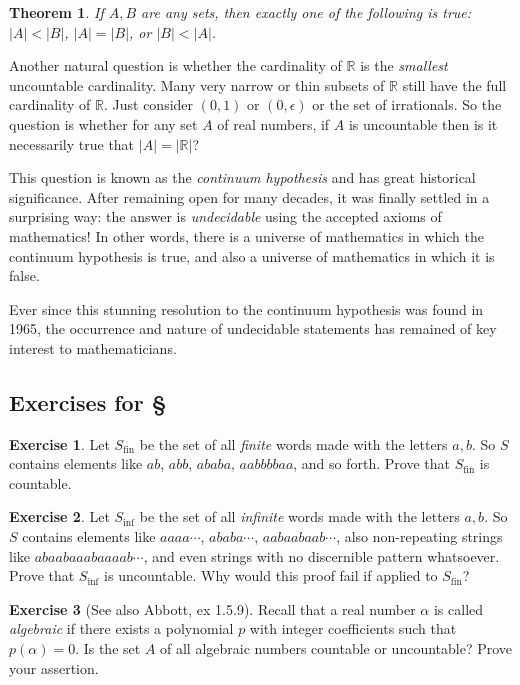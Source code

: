 \documentclass[11pt,oneside]{amsbook}
\newcommand{\R}{\mathbb R}
\theoremstyle{definition}
\newtheorem{exerc}{Exercise}[section]
\theoremstyle{plain}
\newtheorem{thm}{Theorem}[section]
\theoremstyle{definition}
\theoremstyle{remark}
\numberwithin{equation}{section}
\numberwithin{figure}{section}
\begin{document}
\begin{thm}
  If $A,B$ are any sets, then exactly one of the following is true: $|A|<|B|$, $|A|=|B|$, or $|B|<|A|$.
\end{thm}

Another natural question is whether the cardinality of $\R$ is the \emph{smallest} uncountable cardinality. Many very narrow or thin subsets of $\R$ still have the full cardinality of $\R$. Just consider $(0,1)$ or $(0,\epsilon)$ or the set of irrationals. So the question is whether for any set $A$ of real numbers, if $A$ is uncountable then is it necessarily true that $|A|=|\R|$?

This question is known as the \emph{continuum hypothesis} and has great historical significance. After remaining open for many decades, it was finally settled in a surprising way: the answer is \emph{undecidable} using the accepted axioms of mathematics! In other words, there is a universe of mathematics in which the continuum hypothesis is true, and also a universe of mathematics in which it is false.

Ever since this stunning resolution to the continuum hypothesis was found in 1965, the occurrence and nature of undecidable statements has remained of key interest to mathematicians.

\newpage
\subsection*{Exercises for \S \thesection}

\begin{exerc}
  Let $S_\text{fin}$ be the set of all \emph{finite} words made with the letters $a,b$. So $S$ contains elements like $ab$, $abb$, $ababa$, $aabbbbaa$, and so forth. Prove that $S_\text{fin}$ is countable.
\end{exerc}

\begin{exerc}
  Let $S_\text{inf}$ be the set of all \emph{infinite} words made with the letters $a,b$. So $S$ contains elements like $aaaa\cdots$, $ababa\cdots$, $aabaabaab\cdots$, also non-repeating strings like $abaabaaabaaaab\cdots$, and even strings with no discernible pattern whatsoever. Prove that $S_\text{inf}$ is uncountable. Why would this proof fail if applied to $S_\text{fin}$?
\end{exerc}

\begin{exerc}[See also Abbott, ex 1.5.9]
  Recall that a real number $\alpha$ is called \emph{algebraic} if there exists a polynomial $p$ with integer coefficients such that $p(\alpha)=0$. Is the set $A$ of all algebraic numbers countable or uncountable? Prove your assertion.
\end{exerc}
\end{document}
